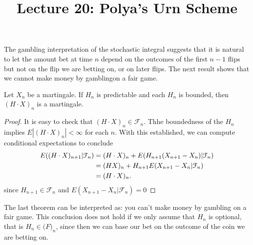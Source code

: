\documentclass[a4paper,english,12pt]{article}
\title{Lecture 20: Polya's Urn Scheme}
\author{}
\begin{document}
\maketitle
The gambling interpretation of the stochastic integral suggests that it is natural to let the amount bet at time $n$ depend on the outcomes of the first $n-1$ flips but not on the flip we are betting on, or on later flips. The next result shows that we cannot make money by gamblingon a fair game.

\begin{thm}Let $X_n$ be a martingale. If $H_n$ is predictable and each $H_n$ is bounded, then $(H\cdot X)_n$ is a martingale.
\end{thm}
\begin{proof} It is easy to check that $(H\cdot X)_n \in \mathcal{F}_n$. Thhe boundedness of the $H_n$ implies $E|(H\cdot X)_n|<\infty$ for each $n$. With this established, we can compute conditional expectations to conclude
\begin{align*}
E((H\cdot X)_{n+1}| \mathcal{F}_n)&=(H\cdot X)_n+E(H_{n+1}(X_{n+1}-X_n)| \mathcal{F}_n)\\
       &=(HX)_n+H_{n+1}E(X_{n+1}-X_n| \mathcal{F}_n)\\
       &=(H\cdot X)_n.\qedhere
\end{align*}
since $H_{n+1}\in \mathcal{F}_n$ and $E(X_{n+1}-X_n| \mathcal{F}_n)=0$
\end{proof}
The last theorem can be interpreted as: you can't make money by gambling on a fair game. This conclusion does not hold if we only assume that $H_n$ is optional, that is $H_n\in \mathcal(F)_n$, since then we can base our bet on the outcome of the coin we are betting on.
\end{document}
